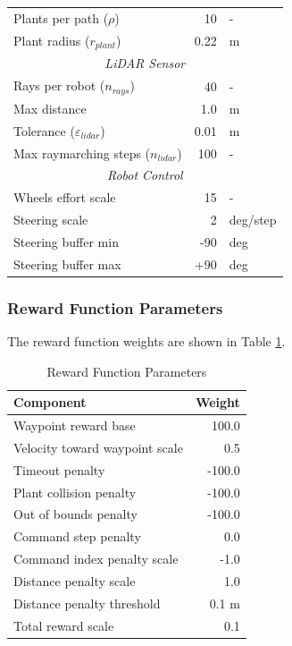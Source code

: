 \documentclass[11pt,a4paper,twocolumn]{article}
\begin{document}
\begin{table}[h]
\begin{tabular}{|l|r|l|}
\hline
Plants per path ($\rho$) & 10 & - \\
Plant radius ($r_{plant}$) & 0.22 & m \\
\hline
\multicolumn{3}{|c|}{\textit{LiDAR Sensor}} \\
\hline
Rays per robot ($n_{rays}$) & 40 & - \\
Max distance & 1.0 & m \\
Tolerance ($\varepsilon_{lidar}$) & 0.01 & m \\
Max raymarching steps ($n_{lidar}$) & 100 & - \\
\hline
\multicolumn{3}{|c|}{\textit{Robot Control}} \\
\hline
Wheels effort scale & 15 & - \\
Steering scale & 2 & deg/step \\
Steering buffer min & -90 & deg \\
Steering buffer max & +90 & deg \\
\hline
\end{tabular}
\end{table}

\subsubsection{Reward Function Parameters}
The reward function weights are shown in Table \ref{tab:reward_params}.

\begin{table}[h]
\centering
\caption{Reward Function Parameters}
\label{tab:reward_params}
\small
\begin{tabular}{|l|r|}
\hline
\textbf{Component} & \textbf{Weight} \\
\hline
Waypoint reward base & 100.0 \\
Velocity toward waypoint scale & 0.5 \\
Timeout penalty & -100.0 \\
Plant collision penalty & -100.0 \\
Out of bounds penalty & -100.0 \\
Command step penalty & 0.0 \\
Command index penalty scale & -1.0 \\
Distance penalty scale & 1.0 \\
Distance penalty threshold & 0.1 m \\
Total reward scale & 0.1 \\
\hline
\end{tabular}
\end{table}
\end{document}
